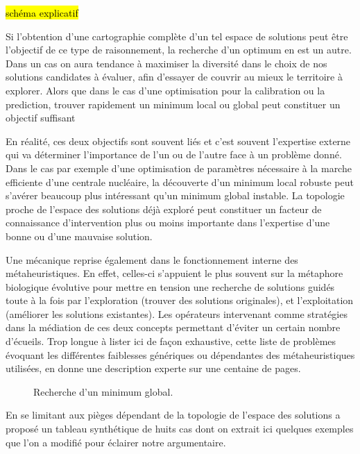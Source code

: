 \hl{schéma explicatif}

Si l'obtention d'une cartographie complète d'un tel espace de solutions peut être l'objectif de ce type de raisonnement, la recherche d'un optimum en est un autre. Dans un cas on aura tendance à maximiser la diversité dans le choix de nos solutions candidates à évaluer, afin d'essayer de couvrir au mieux le territoire à explorer. Alors que dans le cas d'une optimisation pour la calibration ou la prediction, trouver rapidement un minimum local ou global peut constituer un objectif suffisant

En réalité, ces deux objectifs sont souvent liés et c'est souvent l'expertise externe qui va déterminer l'importance de l'un ou de l'autre face à un problème donné. Dans le cas par exemple d'une optimisation de paramètres nécessaire à la marche efficiente d'une centrale nucléaire, la découverte d'un minimum local robuste peut s'avérer beaucoup plus intéressant qu'un minimum global instable. La topologie proche de l'espace des solutions déjà exploré peut constituer un facteur de connaissance d'intervention plus ou moins importante dans l'expertise d'une bonne ou d'une mauvaise solution. 

Une mécanique reprise également dans le fonctionnement interne des métaheuristiques. En effet, celles-ci s'appuient le plus souvent sur la métaphore biologique évolutive pour mettre en tension une recherche de solutions guidés toute à la fois par l'exploration (trouver des solutions originales), et l'exploitation (améliorer les solutions existantes). Les opérateurs intervenant comme stratégies dans la médiation de ces deux concepts permettant d'éviter un certain nombre d'écueils. Trop longue à lister ici de façon exhaustive, cette liste de problèmes évoquant les différentes faiblesses génériques ou dépendantes des métaheuristiques utilisées, \autocite{Weise2011} en donne une description experte sur une centaine de pages. 

\begin{figure}[h]
  \centering
  \qquad
  \caption{Recherche d'un minimum global.}
  \label{fig:hmap2ab}
\end{figure}

En se limitant aux pièges dépendant de la topologie de l'espace des solutions \textcite[140]{Weise2011} a proposé un tableau synthétique de huits cas dont on extrait ici quelques exemples que l'on a modifié pour éclairer notre argumentaire.

